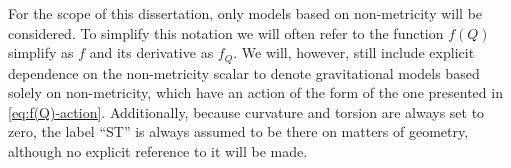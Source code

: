 For the scope of this dissertation, only models based on non-metricity will be considered. To simplify this notation we will often refer to the function $f(Q)$ simplify as $f$ and its derivative as $f_Q$. We will, however, still include explicit dependence on the non-metricity scalar to denote gravitational models based solely on non-metricity, which have an action of the form of the one presented in \cref{eq:f(Q)-action}. Additionally, because curvature and torsion are always set to zero, the label ``ST'' is always assumed to be there on matters of geometry, although no explicit reference to it will be made.
